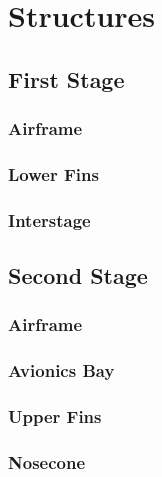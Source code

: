 \section{Structures} \label{section:structures}
\subsection{First Stage}
\subsubsection{Airframe}
\subsubsection{Lower Fins}
\subsubsection{Interstage}

\subsection{Second Stage}
\subsubsection{Airframe}
\subsubsection{Avionics Bay}
\subsubsection{Upper Fins}
\subsubsection{Nosecone}


